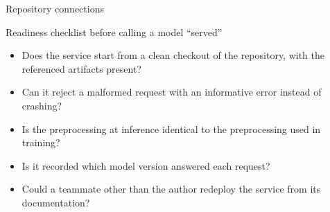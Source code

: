 \begin{frame}{Repository connections}
\coursefooter
\end{frame}

\begin{frame}{Readiness checklist before calling a model ``served''}
\begin{itemize}
\item Does the service start from a clean checkout of the repository, with the referenced artifacts present?
\item Can it reject a malformed request with an informative error instead of crashing?
\item Is the preprocessing at inference identical to the preprocessing used in training?
\item Is it recorded which model version answered each request?
\item Could a teammate other than the author redeploy the service from its documentation?
\end{itemize}
\coursefooter
\end{frame}

